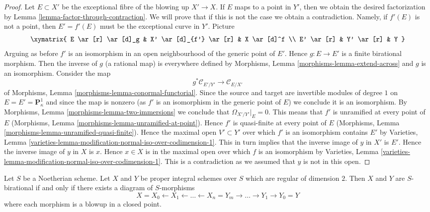 \begin{proof}
\medskip\noindent
Let $E \subset X'$ be the exceptional fibre of the blowing up
$X' \to X$. If $E$ maps to a point in $Y'$, then we obtain the
desired factorization by Lemma \ref{lemma-factor-through-contraction}.
We will prove that
if this is not the case we obtain a contradiction. Namely,
if $f'(E)$ is not a point, then
$E' = f'(E)$ must be the exceptional curve in $Y'$.
Picture
$$
\xymatrix{
E \ar[r] \ar[d]_g & X' \ar[d]_{f'} \ar[r] & X \ar[d]^f \\
E' \ar[r] & Y' \ar[r] & Y
}
$$
Arguing as before $f'$ is an isomorphism in an open neighbourhood
of the generic point of $E'$. Hence $g : E \to E'$ is a finite birational
morphism. Then the inverse of $g$ (a rational map) is everywhere defined
by Morphisms, Lemma \ref{morphisms-lemma-extend-across} and $g$ is
an isomorphism. Consider the map
$$
g^*\mathcal{C}_{E'/Y'} \longrightarrow \mathcal{C}_{E/X'}
$$
of Morphisms, Lemma \ref{morphisms-lemma-conormal-functorial}.
Since the source and target are invertible modules of degree $1$
on $E = E' = \mathbf{P}^1_\kappa$ and since the map is
nonzero (as $f'$ is an isomorphism in the generic point of $E$)
we conclude it is an isomorphism. By
Morphisms, Lemma \ref{morphisms-lemma-two-immersions}
we conclude that $\Omega_{X'/Y'}|_E = 0$.
This means that $f'$ is unramified at every point of $E$
(Morphisms, Lemma \ref{morphisms-lemma-unramified-at-point}).
Hence $f'$ is quasi-finite at every point of $E$
(Morphisms, Lemma \ref{morphisms-lemma-unramified-quasi-finite}).
Hence the maximal open $V' \subset Y'$ over which $f'$ is an
isomorphism contains $E'$ by Varieties, Lemma
\ref{varieties-lemma-modification-normal-iso-over-codimension-1}.
This in turn implies that the inverse image of $y$ in
$X'$ is $E'$. Hence the inverse image of $y$ in $X$ is $x$.
Hence $x \in X$ is in the maximal open over which
$f$ is an isomorphism by Varieties, Lemma
\ref{varieties-lemma-modification-normal-iso-over-codimension-1}.
This is a contradiction as we assumed that $y$ is not
in this open.
\end{proof}

\begin{lemma}
\label{lemma-birational-regular-surfaces}
Let $S$ be a Noetherian scheme. Let $X$ and $Y$ be proper
integral schemes over $S$ which are regular of dimension $2$.
Then $X$ and $Y$ are $S$-birational if and only if there
exists a diagram of $S$-morphisms
$$
X = X_0 \leftarrow X_1 \leftarrow \ldots \leftarrow X_n = Y_m
\to \ldots \to Y_1 \to Y_0 = Y
$$
where each morphism is a blowup in a closed point.
\end{lemma}

